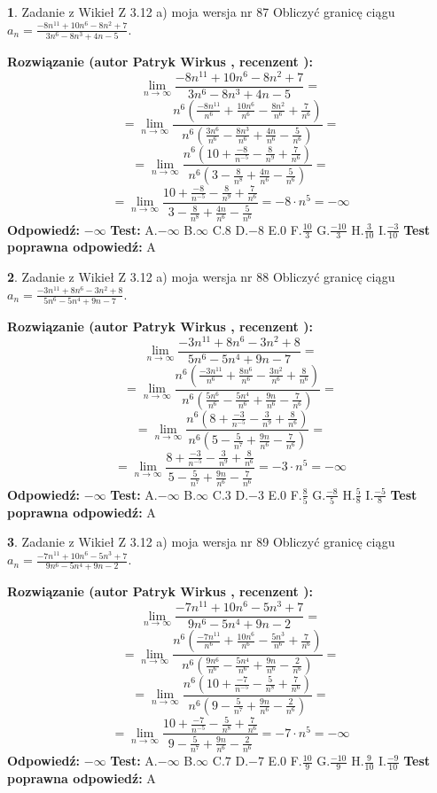 \documentclass[12pt, a4paper]{article}
\theoremstyle{definition} %
\newtheorem{zad}{}
\newcommand{\zadStart}[1]{\begin{zad}#1\newline}
\newcommand{\zadStop}{\end{zad}}
\newcommand{\rozwStart}[2]{\noindent \textbf{Rozwiązanie (autor #1 , recenzent #2): }\newline}
\newcommand{\rozwStop}{\newline}
\newcommand{\odpStart}{\noindent \textbf{Odpowiedź:}\newline}
\newcommand{\odpStop}{\newline}
\newcommand{\testStart}{\noindent \textbf{Test:}\newline}
\newcommand{\testStop}{\newline}
\newcommand{\kluczStart}{\noindent \textbf{Test poprawna odpowiedź:}\newline}
\newcommand{\kluczStop}{\newline}
\begin{document}
\zadStart{Zadanie z Wikieł Z 3.12 a) moja wersja nr 87}
Obliczyć granicę ciągu $a_{n}=\frac{-8n^{11}+10n^{6}-8n^{2}+7}{3n^{6}-8n^{3}+4n-5}$.
\zadStop
\rozwStart{Patryk Wirkus}{}
$$\lim\limits_{n\to\infty}\frac{-8n^{11}+10n^{6}-8n^{2}+7}{3n^{6}-8n^{3}+4n-5}=$$
$$=\lim\limits_{n\to\infty}\frac{n^{6}\left(\frac{-8n^{11}}{n^{6}}+\frac{10n^{6}}{n^{6}}-\frac{8n^{2}}{n^{6}}+\frac{7}{n^{6}}\right)}{n^{6}\left(\frac{3n^{6}}{n^{6}}-\frac{8n^{3}}{n^{6}}+\frac{4n}{n^{6}}-\frac{5}{n^{6}}\right)}=$$
$$=\lim\limits_{n\to\infty}\frac{n^{6}\left(10+\frac{-8}{n^{-5}}-\frac{8}{n^{9}}+\frac{7}{n^{6}}\right)}
{n^{6}\left(3-\frac{8}{n^{8}}+\frac{4n}{n^{6}}-\frac{5}{n^{6}}\right)}=$$
$$=\lim\limits_{n\to\infty}\frac{10+\frac{-8}{n^{-5}}-\frac{8}{n^{9}}+\frac{7}{n^{6}}}{3-\frac{8}{n^{8}}+\frac{4n}{n^{6}}-\frac{5}{n^{6}}}=-8\cdot n^{5} = -\infty$$
\rozwStop
\odpStart
$-\infty$
\odpStop
\testStart
A.$-\infty$
B.$\infty$
C.$8$
D.$-8$
E.$0$
F.$\frac{10}{3}$
G.$\frac{-10}{3}$
H.$\frac{3}{10}$
I.$\frac{-3}{10}$
\testStop
\kluczStart
A
\kluczStop



\zadStart{Zadanie z Wikieł Z 3.12 a) moja wersja nr 88}
Obliczyć granicę ciągu $a_{n}=\frac{-3n^{11}+8n^{6}-3n^{2}+8}{5n^{6}-5n^{4}+9n-7}$.
\zadStop
\rozwStart{Patryk Wirkus}{}
$$\lim\limits_{n\to\infty}\frac{-3n^{11}+8n^{6}-3n^{2}+8}{5n^{6}-5n^{4}+9n-7}=$$
$$=\lim\limits_{n\to\infty}\frac{n^{6}\left(\frac{-3n^{11}}{n^{6}}+\frac{8n^{6}}{n^{6}}-\frac{3n^{2}}{n^{6}}+\frac{8}{n^{6}}\right)}{n^{6}\left(\frac{5n^{6}}{n^{6}}-\frac{5n^{4}}{n^{6}}+\frac{9n}{n^{6}}-\frac{7}{n^{6}}\right)}=$$
$$=\lim\limits_{n\to\infty}\frac{n^{6}\left(8+\frac{-3}{n^{-5}}-\frac{3}{n^{9}}+\frac{8}{n^{6}}\right)}
{n^{6}\left(5-\frac{5}{n^{7}}+\frac{9n}{n^{6}}-\frac{7}{n^{6}}\right)}=$$
$$=\lim\limits_{n\to\infty}\frac{8+\frac{-3}{n^{-5}}-\frac{3}{n^{9}}+\frac{8}{n^{6}}}{5-\frac{5}{n^{7}}+\frac{9n}{n^{6}}-\frac{7}{n^{6}}}=-3\cdot n^{5} = -\infty$$
\rozwStop
\odpStart
$-\infty$
\odpStop
\testStart
A.$-\infty$
B.$\infty$
C.$3$
D.$-3$
E.$0$
F.$\frac{8}{5}$
G.$\frac{-8}{5}$
H.$\frac{5}{8}$
I.$\frac{-5}{8}$
\testStop
\kluczStart
A
\kluczStop



\zadStart{Zadanie z Wikieł Z 3.12 a) moja wersja nr 89}
Obliczyć granicę ciągu $a_{n}=\frac{-7n^{11}+10n^{6}-5n^{3}+7}{9n^{6}-5n^{4}+9n-2}$.
\zadStop
\rozwStart{Patryk Wirkus}{}
$$\lim\limits_{n\to\infty}\frac{-7n^{11}+10n^{6}-5n^{3}+7}{9n^{6}-5n^{4}+9n-2}=$$
$$=\lim\limits_{n\to\infty}\frac{n^{6}\left(\frac{-7n^{11}}{n^{6}}+\frac{10n^{6}}{n^{6}}-\frac{5n^{3}}{n^{6}}+\frac{7}{n^{6}}\right)}{n^{6}\left(\frac{9n^{6}}{n^{6}}-\frac{5n^{4}}{n^{6}}+\frac{9n}{n^{6}}-\frac{2}{n^{6}}\right)}=$$
$$=\lim\limits_{n\to\infty}\frac{n^{6}\left(10+\frac{-7}{n^{-5}}-\frac{5}{n^{8}}+\frac{7}{n^{6}}\right)}
{n^{6}\left(9-\frac{5}{n^{7}}+\frac{9n}{n^{6}}-\frac{2}{n^{6}}\right)}=$$
$$=\lim\limits_{n\to\infty}\frac{10+\frac{-7}{n^{-5}}-\frac{5}{n^{8}}+\frac{7}{n^{6}}}{9-\frac{5}{n^{7}}+\frac{9n}{n^{6}}-\frac{2}{n^{6}}}=-7\cdot n^{5} = -\infty$$
\rozwStop
\odpStart
$-\infty$
\odpStop
\testStart
A.$-\infty$
B.$\infty$
C.$7$
D.$-7$
E.$0$
F.$\frac{10}{9}$
G.$\frac{-10}{9}$
H.$\frac{9}{10}$
I.$\frac{-9}{10}$
\testStop
\kluczStart
A
\kluczStop
\end{document}
